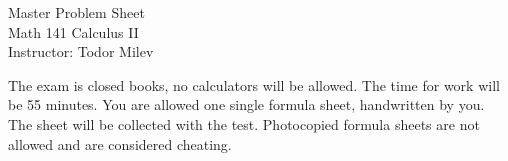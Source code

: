 \documentclass{article}
\begin{document}
\begin{center}
\Large
Master Problem Sheet \\ Math 141 Calculus II \\ \normalsize Instructor: Todor Milev
\end{center}


\noindent The exam is closed books, no calculators will be allowed. The time for work will be 55 minutes. You are allowed one single formula sheet, handwritten by you. The sheet will be collected with the test. Photocopied formula sheets are not allowed and are considered cheating. 
\end{document}
